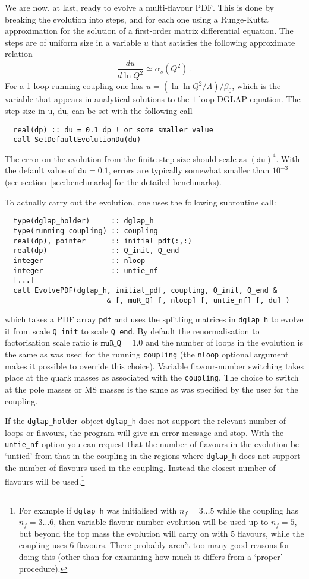 \documentclass[12pt]{article}
\newcommand{\as}{\alpha_s}
\newcommand{\MSbar}{\overline{\mathrm{MS}}}
\newcommand{\ttt}[1]{\texttt{#1}}
\begin{document}
We are now, at last,
 ready to evolve a multi-flavour PDF. This is done by breaking the
evolution into steps, and for each one using a Runge-Kutta
approximation for the solution of a first-order matrix differential
equation. The steps are of uniform size in a variable $u$ that
satisfies the following approximate relation
\begin{equation}
  \label{eq:du}
  \frac{du}{d\ln Q^2} \simeq \as(Q^2) \ .
\end{equation}
For a 1-loop running coupling one has $u = (\ln \ln
Q^2/\Lambda)/\beta_0$, which is the variable that appears in
analytical solutions to the $1$-loop DGLAP equation.
%
The step size in u, du, can be set with the following call
\begin{lstlisting}
  real(dp) :: du = 0.1_dp ! or some smaller value
  call SetDefaultEvolutionDu(du)
\end{lstlisting}
The error on the evolution from the finite step size should scale as
$(\ttt{du})^4$. With the default value of $\ttt{du}=0.1$, errors are
typically somewhat smaller than $10^{-3}$ (see
section~\ref{sec:benchmarks} for the detailed benchmarks).

To actually carry out the evolution, one uses the following subroutine
call:
\begin{lstlisting}
  type(dglap_holder)     :: dglap_h
  type(running_coupling) :: coupling
  real(dp), pointer      :: initial_pdf(:,:)
  real(dp)               :: Q_init, Q_end
  integer                :: nloop
  integer                :: untie_nf
  [...]
  call EvolvePDF(dglap_h, initial_pdf, coupling, Q_init, Q_end &
                        & [, muR_Q] [, nloop] [, untie_nf] [, du] )
\end{lstlisting}
which takes a PDF array 
\ttt{pdf} and uses the splitting matrices in \ttt{dglap\_h}  to
evolve it from scale \ttt{Q\_init} to scale \ttt{Q\_end}.
%
By default the renormalisation to factorisation scale ratio is
$\ttt{muR\_Q} = 1.0$ and the number of loops in the evolution is the
same as was used for the running \ttt{coupling} (the \ttt{nloop}
optional argument makes it possible to override this choice). Variable
flavour-number switching takes place at the quark masses as associated
with the \ttt{coupling}.
%
The choice to switch at the pole masses or $\MSbar$ masses is the same
as was specified by the user for the coupling.

If the \ttt{dglap\_holder} object \ttt{dglap\_h} does not support the
relevant number of loops or flavours, the program will give an error
message and stop. With the \ttt{untie\_nf} option you can request that
the number of flavours in the evolution be `untied' from that in the
coupling in the regions where \ttt{dglap\_h} does not support the number of
flavours used in the coupling. Instead the closest number of flavours
will be used.\footnote{For example if \ttt{dglap\_h} was initialised with
  $n_f = 3\ldots5$ while the coupling has $n_f = 3\ldots 6$, then
  variable flavour number evolution will be used up to $n_f = 5$, but
  beyond the top mass the evolution will carry on with $5$ flavours,
  while the coupling uses $6$ flavours. There probably aren't too many
  good reasons for doing this (other than for examining how much it
  differs from a `proper' procedure).}
\end{document}
